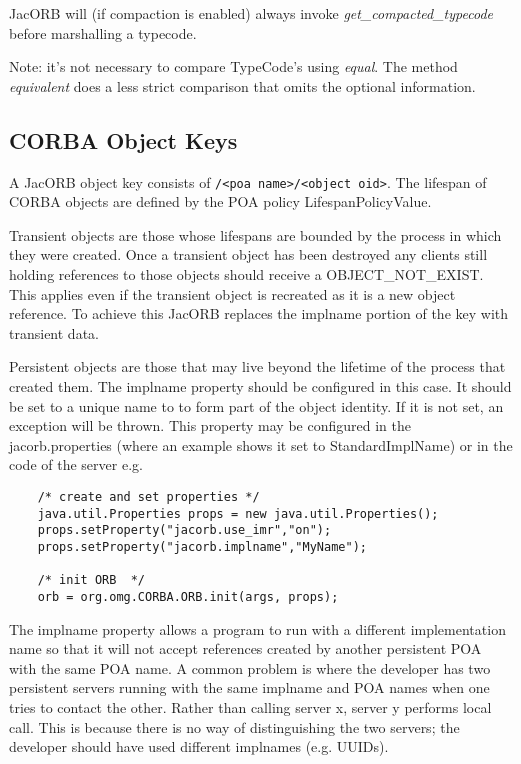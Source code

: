 JacORB will (if compaction is enabled) always invoke \emph{get\_compacted\_typecode} before marshalling a typecode.

Note: it's not necessary to compare TypeCode's using \emph{equal}. The method \emph{equivalent} does a less strict comparison
that omits the optional information.

\subsection{CORBA Object Keys}
\label{implname}
A JacORB object key consists of {\tt <impl name>/<poa name>/<object oid>}. The lifespan of CORBA objects are defined by the POA policy LifespanPolicyValue.

Transient objects are those whose lifespans are bounded by the process in which they were created. Once a transient object has been destroyed any clients still holding references to those objects should receive a OBJECT\_NOT\_EXIST. This applies even if the transient object is recreated as it is a new object reference. To achieve this JacORB replaces the implname portion of the key with transient data.

Persistent objects are those that may live beyond the lifetime of the process that created them. The implname property should be configured in this case. It should be set to a unique name to to form part of the object identity. If it is not set, an exception will be thrown. This property may be configured in the jacorb.properties (where an example shows it set to StandardImplName) or in the code of the server e.g.
\small{
\begin{verbatim}
    /* create and set properties */
    java.util.Properties props = new java.util.Properties();
    props.setProperty("jacorb.use_imr","on");
    props.setProperty("jacorb.implname","MyName");

    /* init ORB  */
    orb = org.omg.CORBA.ORB.init(args, props);
\end{verbatim}
}

The implname property allows a program to run with a different implementation name so that it will not accept references created by another persistent POA with the same POA name. A common problem is where the developer has two persistent servers running with the same implname and POA names when one tries to contact the other. Rather than calling server x, server y performs local call. This is because there is no way of distinguishing the two servers; the developer should have used different implnames (e.g. UUIDs).

